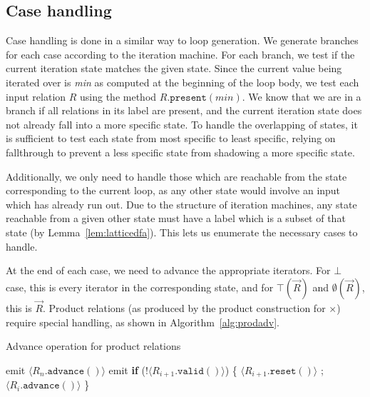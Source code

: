 \documentclass[acmsmall,screen,nonacm]{acmart}\settopmatter{printfolios=true,printccs=false,printacmref=false}
\begin{document}
\subsection{Case handling}
\label{subsec:case-handling}

Case handling is done in a similar way to loop generation. We generate
branches for each case according to the iteration machine.
For each branch, we test if the current iteration state matches the
given state. Since the current value being iterated over is
\textit{min} as computed at the beginning of the loop body, we test
each input relation $R$ using the method
$R.\texttt{present}(\textit{min})$.
We know that we are in a branch
if all relations in its label are present, and the current iteration
state does not already fall into a more specific state.
To handle the overlapping of states, it is sufficient to test each
state from most specific to least specific, relying on fallthrough to
prevent a less specific state from shadowing a more specific state.


Additionally, we only need to handle those which are reachable from
the state corresponding to the current loop, as any other state would
involve an input which has already run out. Due to the structure of
iteration machines, any state reachable from a given other state must
have a label which is a subset of that state (by
Lemma~\ref{lem:latticedfa}). This lets us enumerate the necessary cases to handle.

At the end of each case, we need to advance the appropriate iterators. For $\bot$ case, this is every iterator in the corresponding state, and for $\top(\vec{R})$ and $\emptyset(\vec{R})$, this is $\vec{R}$. Product relations (as produced by the product construction for $\times$) require special handling, as shown in Algorithm~\ref{alg:prodadv}.

\begin{algorithm}[tbp]
    \caption{Advance operation for product relations}
    \begin{algorithmic}\footnotesize
            \State emit $\langle R_n.\texttt{advance}() \rangle$
                \State emit \textbf{if} ($!\langle R_{i+1}.\texttt{valid}() \rangle$) \{
                $\langle R_{i+1}.\texttt{reset}() \rangle$
                ; $\langle R_i.\texttt{advance}() \rangle$
                \}
            \EndFor
        \EndProcedure
    \end{algorithmic}
    \label{alg:prodadv}
\end{algorithm}
\end{document}

